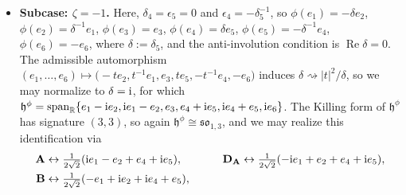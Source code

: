\documentclass[10pt,a4paper]{amsart}
\newlength{\caseIndent}
\DeclareMathOperator{\spanOperator}{span}
\renewcommand{\Re}{\operatorname{Re}}
\newcommand{\Span}[1]{\spanOperator\{{#1}\}}
\newcommand{\bbR}{\mathbb{R}}
\newcommand{\mbA}{\mathbf{A}}
\newcommand{\mbB}{\mathbf{B}}
\newcommand{\mbC}{\mathbf{C}}
\newcommand{\mbD}{\mathbf{D}}
\newcommand{\mfd} {\mathfrak{d}}
\newcommand{\mfh} {\mathfrak{h}}
\newcommand{\mfk} {\mathfrak{k}}
\newcommand{\mfso} {\mathfrak{so}}
\numberwithin{equation}{section}
\begin{document}
\begin{itemize}[leftmargin=\caseIndent]
 If we fix a basis $(\mbA, \mbB, \mbC, \mbD_{\mbA}, \mbD_{\mbB}, \mbD_{\mbC})$ of $\mfso_{1, 3}$ satisfying the identities $[\mbA, \mbB] = \mbC$, $[\mbA, \mbD_{\mbB}] = -[\mbB, \mbD_{\mbA}] = \mbD_{\mbC}$, and $[\mbD_{\mbA}, \mbD_{\mbB}] = \mbC$ and their cyclic permutations, as well as $[\mbA, \mbD_{\mbA}] = [\mbB, \mbD_{\mbB}] = [\mbC, \mbD_{\mbC}] = 0$, then we may realize this identification explicitly via
		\begin{alignat*}{4}
			 \mbA &\leftrightarrow \tfrac{1}{2} (- e_2 + e_4) , \qquad
			&\mbD_{\mbA} &\leftrightarrow \tfrac{1}{2} {\rm i} (- e_1 + e_5) , \\
			 \mbB &\leftrightarrow \tfrac{1}{2} {\rm i} ( e_1 + e_5) , \qquad
			&\mbD_{\mbB} &\leftrightarrow \tfrac{1}{2} ( e_2 + e_4) , \\
			 \mbC &\leftrightarrow \tfrac{1}{2} {\rm i} e_3 , \qquad
			&\mbD_{\mbC} &\leftrightarrow \tfrac{1}{2} e_6 .
		\end{alignat*}
		Then, the model, which we denote $\mathbf{D.6}_{-1}^{3-}$, is
		\begin{gather*}
			\boxed{
 \mfh^{\phi} \cong \mfso_{1, 3} , \qquad
 \mfk^{\phi} = \Span{\mbD_{\mbC}} , \qquad
				\mfd^{\phi} = \Span{\mbA + \mbD_{\mbB}, \mbB + \mbD_{\mbA}} \oplus \mfk^{\phi} .
			}
		\end{gather*}
	\item[] \textbf{Subcase: $\zeta = -1$.} Here, $\delta_4 = \epsilon_5 = 0$ and $\epsilon_4 = -\delta_5^{-1}$, so $\phi(e_1) = -\delta e_2$, $\phi(e_2) = \delta^{-1} e_1$, $\phi(e_3) = e_3$, $\phi(e_4) = \delta e_5$, $\phi(e_5) = -\delta^{-1} e_4$, $\phi(e_6) = -e_6$, where $\delta := \delta_5$, and the anti-involution condition is $\Re \delta = 0$. The admissible automorphism $(e_1, \ldots, e_6) \mapsto \big({-}t e_2, t^{-1} e_1, e_3, t e_5, -t^{-1} e_4, -e_6\big)$ induces $\delta \rightsquigarrow |t|^2 / \delta$, so we may normalize to $\delta = {\rm i}$, for which $\mfh^{\phi} = \spanOperator_{\bbR}\{e_1 - {\rm i} e_2, {\rm i} e_1 - e_2, e_3, e_4 + {\rm i} e_5, {\rm i} e_4 + e_5, {\rm i} e_6\}$. The Killing form of $\mfh^{\phi}$ has signature $(3, 3)$, so again $\mfh^{\phi} \cong \mfso_{1, 3}$, and we may realize this identification via
		\begin{alignat*}{4}
			 \mbA &\leftrightarrow \tfrac{1}{2 \sqrt{2}} ({\rm i} e_1 - e_2 + e_4 + {\rm i} e_5) , \qquad
			&\mbD_{\mbA} &\leftrightarrow \tfrac{1}{2 \sqrt{2}} (-{\rm i} e_1 + e_2 + e_4 + {\rm i} e_5) , \\
			 \mbB &\leftrightarrow \tfrac{1}{2 \sqrt{2}} (- e_1 + {\rm i} e_2 + {\rm i} e_4 + e_5) , \qquad

\end{alignat*}
\end{itemize}
\end{document}
